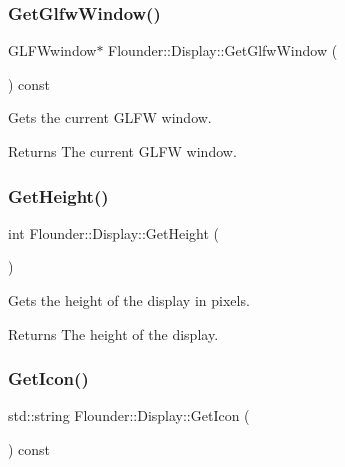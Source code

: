 \subsubsection{\texorpdfstring{Get\+Glfw\+Window()}{GetGlfwWindow()}}
{\footnotesize\ttfamily G\+L\+F\+Wwindow$\ast$ Flounder\+::\+Display\+::\+Get\+Glfw\+Window (\begin{DoxyParamCaption}{ }\end{DoxyParamCaption}) const\hspace{0.3cm}{\ttfamily [inline]}}



Gets the current G\+L\+FW window. 

\begin{DoxyReturn}{Returns}
The current G\+L\+FW window. 
\end{DoxyReturn}
\mbox{\label{class_flounder_1_1_display_aa9fe6379582e7b381ad3bc31442ad305}} 
\subsubsection{\texorpdfstring{Get\+Height()}{GetHeight()}}
{\footnotesize\ttfamily int Flounder\+::\+Display\+::\+Get\+Height (\begin{DoxyParamCaption}{ }\end{DoxyParamCaption})\hspace{0.3cm}{\ttfamily [inline]}}



Gets the height of the display in pixels. 

\begin{DoxyReturn}{Returns}
The height of the display. 
\end{DoxyReturn}
\mbox{\label{class_flounder_1_1_display_a1c18288e7422038fa1018bc4f416c6df}} 
\subsubsection{\texorpdfstring{Get\+Icon()}{GetIcon()}}
{\footnotesize\ttfamily std\+::string Flounder\+::\+Display\+::\+Get\+Icon (\begin{DoxyParamCaption}{ }\end{DoxyParamCaption}) const\hspace{0.3cm}{\ttfamily [inline]}}



